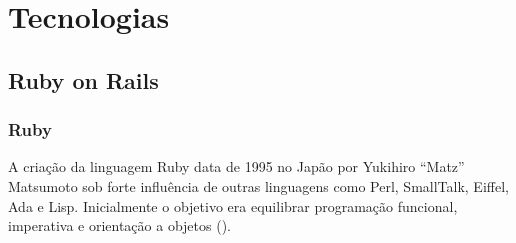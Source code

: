 \chapter{Tecnologias}
\label{cap:tecnologias}
\section{Ruby on Rails}
\subsection{Ruby}
    \par A criação da linguagem Ruby data de 1995 no Japão por Yukihiro ``Matz'' Matsumoto sob forte influência de outras linguagens como Perl, SmallTalk, Eiffel, Ada e Lisp.  Inicialmente o objetivo era equilibrar programação funcional, imperativa e orientação a objetos (\cite{rubydocs}).
